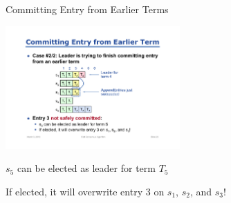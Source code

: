 \begin{frame}[t]{Committing Entry from Earlier Terms}



\begin{center}
\includegraphics[width=0.5\textwidth]{commit2}
\end{center}

\BI
\item $s_5$ can be elected as leader for term $T_5$
\item If elected, it will overwrite entry $3$ on $s_1$, $s_2$, and $s_3$!
\EI

\end{frame}


